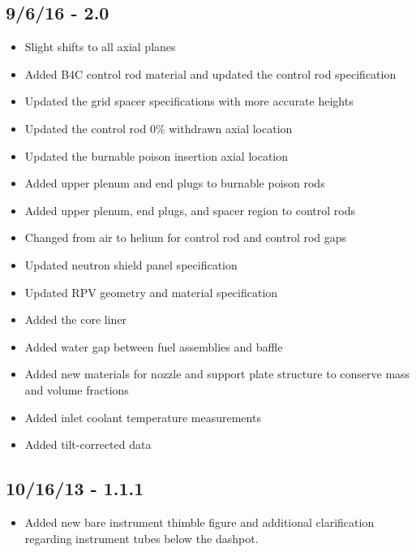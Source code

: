 \subsection*{9/6/16 - 2.0}
\begin{itemize}
  \item Slight shifts to all axial planes
  \item Added B4C control rod material and updated the control rod specification
  \item Updated the grid spacer specifications with more accurate heights
  \item Updated the control rod 0\% withdrawn axial location
  \item Updated the burnable poison insertion axial location
  \item Added upper plenum and end plugs to burnable poison rods
  \item Added upper plenum, end plugs, and spacer region to control rods
  \item Changed from air to helium for control rod and control rod gaps
  \item Updated neutron shield panel specification
  \item Updated RPV geometry and material specification
  \item Added the core liner
  \item Added water gap between fuel assemblies and baffle
  \item Added new materials for nozzle and support plate structure to conserve
        mass and volume fractions
  \item Added inlet coolant temperature measurements
  \item Added tilt-corrected data
\end{itemize}

\subsection*{10/16/13 - 1.1.1}
\begin{itemize}
  \item Added new bare instrument thimble figure and additional clarification
  regarding instrument tubes below the dashpot.
\end{itemize}

